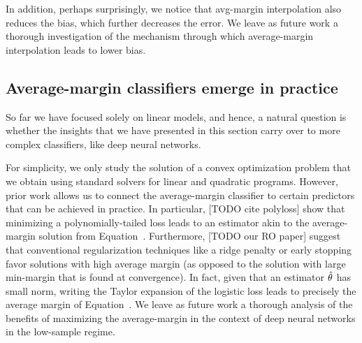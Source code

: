 In addition, perhaps surprisingly, we notice that avg-margin interpolation also
reduces the bias, which further decreases the error. We leave as future work a
thorough investigation of the mechanism through which average-margin
interpolation leads to lower bias.

\subsection{Average-margin classifiers emerge in practice}

So far we have focused solely on linear models, and hence, a natural question is
whether the insights that we have presented in this section carry over to more
complex classifiers, like deep neural networks.

For simplicity, we only study the solution of a convex optimization problem that
we obtain using standard solvers for linear and quadratic programs. However,
prior work allows us to connect the average-margin classifier to certain
predictors that can be achieved in practice.  In particular, [TODO cite
polyloss] show that minimizing a polynomially-tailed loss leads to an estimator
akin to the average-margin solution from Equation~. Furthermore,
[TODO our RO paper] suggest that conventional regularization techniques like a
ridge penalty or early stopping favor solutions with high average margin (as
opposed to the solution with large min-margin that is found at convergence). In
fact, given that an estimator $\hat{\theta}$ has small norm, writing the Taylor
expansion of the logistic loss leads to precisely the average margin of
Equation~.  We leave as future work a thorough analysis of the benefits
of maximizing the average-margin in the context of deep neural networks in the
low-sample regime.

